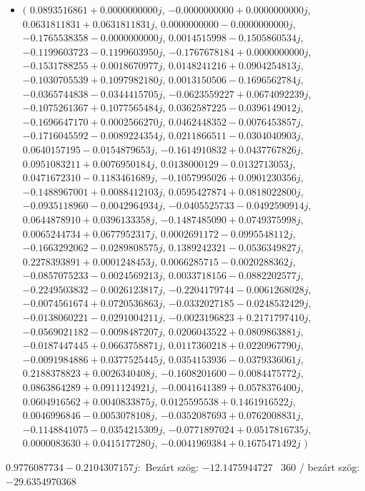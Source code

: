 \documentclass[14pt,a4paper]{article}
\begin{document}
\begin{itemize}
\item
$\big($
$0.0893516861+0.0000000000j$, $-0.0000000000+0.0000000000j$, $0.0631811831+0.0631811831j$, $0.0000000000-0.0000000000j$, $-0.1765538358-0.0000000000j$, $0.0014515998-0.1505860534j$, $-0.1199603723-0.1199603950j$, $-0.1767678184+0.0000000000j$, $-0.1531788255+0.0018670977j$, $0.0148241216+0.0904254813j$, $-0.1030705539+0.1097982180j$, $0.0013150506-0.1696562784j$, $-0.0365744838-0.0344415705j$, $-0.0623559227+0.0674092239j$, $-0.1075261367+0.1077565484j$, $0.0362587225-0.0396149012j$, $-0.1696647170+0.0002566270j$, $0.0462448352-0.0076453857j$, $-0.1716045592-0.0089224354j$, $0.0211866511-0.0304040903j$, $0.0640157195-0.0154879653j$, $-0.1614910832+0.0437767826j$, $0.0951083211+0.0076950184j$, $0.0138000129-0.0132713053j$, $0.0471672310-0.1183461689j$, $-0.1057995026+0.0901230356j$, $-0.1488967001+0.0088412103j$, $0.0595427874+0.0818022800j$, $-0.0935118960-0.0042964934j$, $-0.0405525733-0.0492590914j$, $0.0644878910+0.0396133358j$, $-0.1487485090+0.0749375998j$, $0.0065244734+0.0677952317j$, $0.0002691172-0.0995548112j$, $-0.1663292062-0.0289808575j$, $0.1389242321-0.0536349827j$, $0.2278393891+0.0001248453j$, $0.0066285715-0.0020288362j$, $-0.0857075233-0.0024569213j$, $0.0033718156-0.0882202577j$, $-0.2249503832-0.0026123817j$, $-0.2204179744-0.0061268028j$, $-0.0074561674+0.0720536863j$, $-0.0332027185-0.0248532429j$, $-0.0138060221-0.0291004211j$, $-0.0023196823+0.2171797410j$, $-0.0569021182-0.0098487207j$, $0.0206043522+0.0809863881j$, $-0.0187447445+0.0663758871j$, $0.0117360218+0.0220967790j$, $-0.0091984886+0.0377525445j$, $0.0354153936-0.0379336061j$, $0.2188378823+0.0026340408j$, $-0.1608201600-0.0084475772j$, $0.0863864289+0.0911124921j$, $-0.0041641389+0.0578376400j$, $0.0604916562+0.0040833875j$, $0.0125595538+0.1461916522j$, $0.0046996846-0.0053078108j$, $-0.0352087693+0.0762008831j$, $-0.1148841075-0.0354215309j$, $-0.0771897024+0.0517816735j$, $0.0000083630+0.0415177280j$, $-0.0041969384+0.1675471492j$
$\big)$
\end{itemize}
$0.9776087734-0.2104307157j$:\
Bezárt szög: $-12.1475944727$ \
360 / bezárt szög: $-29.6354970368$\
\end{document}

